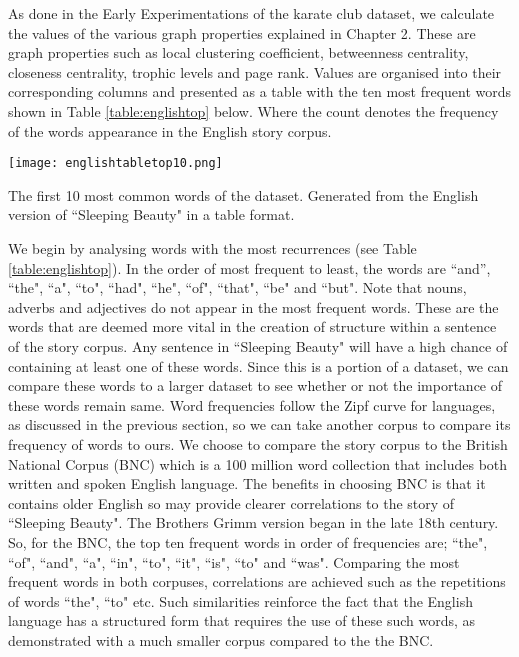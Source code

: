 As done in the Early Experimentations of the karate club dataset, we calculate the values of the various graph properties explained in Chapter 2. These are graph properties such as local clustering coefficient, betweenness centrality, closeness centrality, trophic levels and page rank. Values are organised into their corresponding columns and presented as a table with the ten most frequent words shown in Table \ref{table:englishtop} below. Where the count denotes the frequency of the words appearance in the English story corpus. 

\begin{table}[H]
\centering
\texttt{[image: englishtabletop10.png]}
\caption{The first 10 most common words of the dataset. Generated from the English version of ``Sleeping Beauty" in a table format. }
\label{table:englishtop}
\end{table}

We begin by analysing words with the most recurrences (see Table \ref{table:englishtop}). In the order of most frequent to least, the words are ``and'', ``the", ``a", ``to", ``had", ``he", ``of", ``that", ``be" and ``but". Note that nouns, adverbs and adjectives do not appear in the most frequent words. These are the words that are deemed more vital in the creation of structure within a sentence of the story corpus. Any sentence in ``Sleeping Beauty" will have a high chance of containing at least one of these words. Since this is a portion of a  dataset, we can compare these words to a larger dataset to see whether or not the importance of these words remain same. Word frequencies follow the Zipf curve for languages, as discussed in the previous section, so we can take another corpus to compare its frequency of words to ours. We choose to compare the story corpus to the British National Corpus (BNC) \cite{bnc2007british} which is a 100 million word collection that includes both written and spoken English language. The benefits in choosing BNC is that it contains older English so may provide clearer correlations to the story of ``Sleeping Beauty". The Brothers Grimm version began in the late 18th century. So, for the BNC, the top ten frequent words \cite{leech2014word} in order of frequencies are; ``the", ``of", ``and", ``a", ``in", ``to", ``it", ``is", ``to" and ``was". Comparing the most frequent words in both corpuses, correlations are achieved such as the repetitions of words ``the", ``to" etc. Such similarities reinforce the fact that the English language has a structured form that requires the use of these such words, as demonstrated with a much smaller corpus compared to the the BNC.


